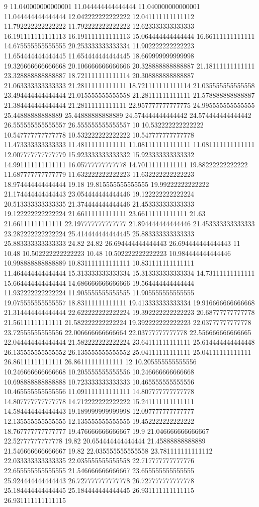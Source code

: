 9 11.040000000000001 11.044444444444444 11.040000000000001 11.044444444444444 12.042222222222222 12.041111111111112 11.792222222222222 11.792222222222222 12.623333333333333 16.191111111111113 16.191111111111113 15.064444444444444 16.66111111111111 14.675555555555555 20.253333333333334 11.902222222222223 11.654444444444445 11.654444444444445 18.669999999999998 19.326666666666668 20.106666666666666 20.328888888888887 21.18111111111111 23.328888888888887 18.721111111111114 20.308888888888887 21.063333333333333 21.28111111111111 18.721111111111114 21.035555555555558 23.494444444444444 21.015555555555558 21.28111111111111 21.578888888888887 21.384444444444444 21.28111111111111 22.957777777777775 24.995555555555555 25.44888888888889 25.44888888888889 24.574444444444442 24.574444444444442 26.555555555555557 26.555555555555557
10 10.532222222222222 10.547777777777778 10.532222222222222 10.547777777777778 11.473333333333333 11.48111111111111 11.081111111111111 11.081111111111111 12.007777777777779 15.923333333333332 15.923333333333332 14.991111111111111 16.05777777777778 14.70111111111111 19.88222222222222 11.687777777777779 11.632222222222223 11.632222222222223 18.974444444444444 19.18 19.815555555555555 19.99222222222222 21.174444444444443 23.054444444444446 19.122222222222224 20.513333333333335 21.374444444444446 21.453333333333333 19.122222222222224 21.66111111111111 23.66111111111111 21.63 21.66111111111111 22.197777777777777 21.894444444444446 21.453333333333333 23.282222222222224 25.414444444444445 25.883333333333333 25.883333333333333 24.82 24.82 26.694444444444443 26.694444444444443
11 10.48 10.502222222222223 10.48 10.502222222222223 10.984444444444446 10.998888888888889 10.831111111111111 10.831111111111111 11.464444444444444 15.313333333333334 15.313333333333334 14.73111111111111 15.664444444444444 14.686666666666666 19.564444444444444 11.932222222222224 11.905555555555555 11.905555555555555 19.075555555555557 18.83111111111111 19.413333333333334 19.916666666666668 21.314444444444444 22.622222222222224 19.392222222222223 20.68777777777778 21.56111111111111 21.582222222222224 19.392222222222223 22.03777777777778 23.72555555555556 22.006666666666664 22.03777777777778 22.556666666666665 22.044444444444444 21.582222222222224 23.64111111111111 25.614444444444448 26.135555555555552 26.135555555555552 25.04111111111111 25.04111111111111 26.86111111111111 26.86111111111111
12 10.205555555555556 10.246666666666668 10.205555555555556 10.246666666666668 10.698888888888888 10.723333333333333 10.465555555555556 10.465555555555556 11.091111111111111 14.807777777777778 14.807777777777778 14.712222222222222 15.241111111111111 14.584444444444443 19.189999999999998 12.097777777777777 12.135555555555555 12.135555555555555 19.452222222222222 18.767777777777777 19.476666666666667 19.9 21.046666666666667 22.52777777777778 19.82 20.654444444444444 21.45888888888889 21.546666666666667 19.82 22.035555555555558 23.781111111111112 22.033333333333335 22.035555555555558 22.717777777777776 22.655555555555555 21.546666666666667 23.655555555555555 25.924444444444443 26.727777777777778 26.727777777777778 25.184444444444445 25.184444444444445 26.931111111111115 26.931111111111115
